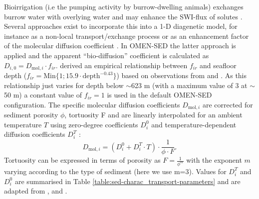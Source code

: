 \documentclass[gmd, manuscript]{copernicus}
\begin{document}
Bioirrigation (i.e the pumping activity by burrow-dwelling animals) exchanges burrow water with overlying water and may enhance the SWI-flux of solutes \citep{aller_importance_1984, aller1988benthic}. 
Several approaches exist to incorporate this into a 1-D diagenetic model, for instance as a non-local transport/exchange process \citep{boudreau_equivalence_1984, emerson_sediment-water_1984} 
or as an enhancement factor of the molecular diffusion coefficient \citep{devol_benthic_1993, soetaert_model_1996}. In OMEN-SED the latter approach is applied and the 
apparent ``bio-diffusion'' coefficient is calculated as $D_{i,0}=D_{\mathrm{mol},i}\cdot f_{ir}$. 
\citet{soetaert_model_1996} derived an empirical relationship between $f_{ir}$ and seafloor depth ($f_{ir} = \mathrm{Min}\{1; 15.9\cdot \mathrm{depth}^{-0.43}\}$) 
based on observations from \citet{archer_benthic_1992} and \citet{devol_benthic_1993}. As this relationship just varies for depth below $\sim$623 m (with a maximum 
value of 3 at $\sim$50 m) a constant value of $f_{ir}=1$ is used in the default OMEN-SED configuration. 
The specific molecular diffusion coefficients $D_{\mathrm{mol},i}$ are corrected for sediment porosity $\phi$, tortuosity F and are linearly interpolated for an ambient 
temperature $T$ using zero-degree coefficients $D^0_i$ and temperature-dependent diffusion coefficients $D^T_i$ \citep[][]{soetaert_model_1996}:
\begin{equation*}
 D_{\mathrm{mol},i} = (D^0_i + D^T_i \cdot T )\cdot \frac{1}{\phi\cdot F}.
\end{equation*}
Tortuosity can be expressed in terms of porosity as $F = \frac{1}{\phi^m}$ \citep{ullman_diffusion_1982} with the exponent $m$ varying according to the type of sediment (here we use m=3). 
Values for $D^T_i$ and $D^0_i$ are summarised in Table \ref{table:sed-charac_transport-parameters} and are adapted from \citet{Li_diffusion_1974}, \citet{schulz_quantification_2006} and \citet{gypens_simple_2008}.
\end{document}
